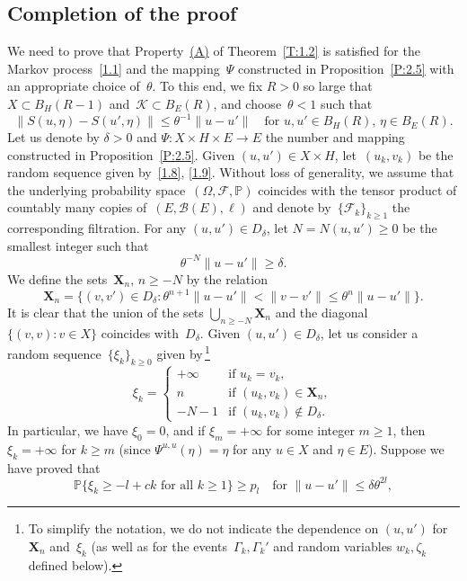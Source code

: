 \documentclass[11pt]{article}
\theoremstyle{plain}
\theoremstyle{definition}
\let\mathcal\mathscr
\theoremstyle{plain}
\numberwithin{equation}{section}
\newcommand{\IP}{{\mathbb P}}
\newcommand{\XXX}{{\boldsymbol{X}}}
\newcommand{\BB}{{\mathcal B}}
\newcommand{\FF}{{\mathcal F}}
\newcommand{\KK}{{\mathcal K}}
\begin{document}
\subsection{Completion of the proof}
\label{s3.4}
We need to prove that Property~\hyperlink{(A)}{(A)} of Theorem~\ref{T:1.2} is satisfied for the Markov process~\eqref{1.1} and the mapping~$\varPsi$ constructed in Proposition~\ref{P:2.5} with an appropriate choice of~$\theta$. To this end, we fix $R>0$ so large that $X\subset B_H(R-1)$ and~$\KK\subset B_E(R)$, and choose~$\theta<1$ such that
\begin{equation} \label{3.26}
\|S(u,\eta)-S(u',\eta)\|\le \theta^{-1}\|u-u'\|\quad
\text{for $u,u'\in B_H(R)$, $\eta\in B_E(R)$}.
\end{equation}
Let us denote by $\delta>0$ and $\varPsi:X\times H\times E\to E$ the number and mapping constructed in Proposition~\ref{P:2.5}. Given $(u,u')\in X\times H$, let~$(u_k,v_k)$ be the random sequence given by~\eqref{1.8}, \eqref{1.9}. Without loss of generality, we assume that the underlying probability space~$(\Omega,\FF,\IP)$ coincides with the tensor product of countably many copies of~$(E,\BB(E),\ell)$ and denote by~$\{\FF_k\}_{k\ge1}$ the corresponding filtration. For any $(u,u')\in D_\delta$, let $N=N(u,u')\ge0$ be the smallest integer such that
\[
\theta^{-N}\|u-u'\|\ge\delta.
\]
We define the sets~$\XXX_n$, $n\ge -N$ by the relation
\begin{equation} \label{3.27}
\XXX_n=\{(v,v')\in D_\delta:\theta^{n+1}\|u-u'\|<\|v-v'\|\le\theta^{n}\|u-u'\|\}.
\end{equation}
It is clear that the union of the sets $\bigcup_{n\ge -N}\XXX_n$ and the diagonal $\{(v,v):v\in X\}$ coincides with~$D_\delta$. Given $(u,u')\in D_\delta$, let us consider a random sequence~$\{\xi_k\}_{k\ge0}$ given by\,\footnote{To simplify the notation, we do not indicate the dependence on $(u,u')$ for~$\XXX_n$ and~$\xi_k$ (as well as for the events~$\Gamma_k,\Gamma_k'$ and random variables $w_k, \zeta_k$ defined below). }
\[
\xi_k=
\begin{cases}
+\infty&\text{if $u_k=v_k$},\\
n&\text{if $(u_k,v_k)\in\XXX_n$}, \\
-N-1 & \text{if $(u_k,v_k)\notin D_\delta$}.
\end{cases}
\]
In particular, we have $\xi_0=0$, and if $\xi_m=+\infty$ for some integer $m\ge1$, then $\xi_k=+\infty$ for $k\ge m$ (since $\varPsi^{u,u}(\eta)=\eta$ for any $u\in X$ and $\eta\in E$). Suppose we have proved that
\begin{equation} \label{3.28}
\IP\{\xi_k\ge -l+ck\text{ for all $k\ge1$}\}\ge p_l
\quad\text{for $\|u-u'\|\le \delta\theta^{2l}$},
\end{equation}
\end{document}
